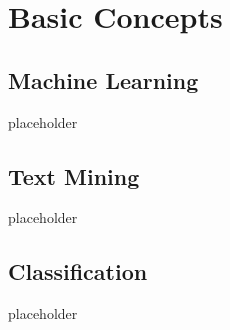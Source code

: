 \section{Basic Concepts}
	\subsection{Machine Learning}
		{\color{red} \Large placeholder}
	\subsection{Text Mining}
		{\color{red} \Large placeholder}
	\subsection{Classification}
		{\color{red} \Large placeholder}
